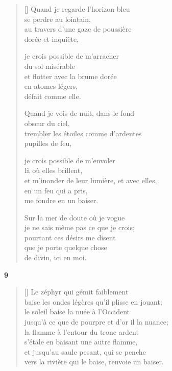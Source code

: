 \documentclass[a4paper,12pt]{book}
\begin{document}
\begin{verse}[\versewidth]
  Quand je regarde l'horizon bleu \\
  se perdre au lointain, \\
  au travers d'une gaze de poussière \\
  dorée et inquiète,

  je crois possible de m'arracher \\
  du sol misérable \\
  et flotter avec la brume dorée \\
  en atomes légers, \\
  défait comme elle.

  Quand je vois de nuit, dans le fond \\
  obscur du ciel, \\
  trembler les étoiles comme d'ardentes \\
  pupilles de feu,

  je crois possible de m'envoler \\
  là où elles brillent, \\
  et m'inonder de leur lumière, et avec elles, \\
  en un feu qui a pris, \\
  me fondre en un baiser.

  Sur la mer de doute où je vogue \\
  je ne sais même pas ce que je crois; \\
  pourtant ces désirs me disent \\
  que je porte quelque chose \\
  de divin, ici en moi.
\end{verse}

\bigskip

\begin{center}
  \textbf{9}
\end{center}

\settowidth{\versewidth}{jusqu'à ce que de pourpre et d'or il la nuance;}

\begin{verse}[\versewidth]
  Le zéphyr qui gémit faiblement \\
  baise les ondes légères qu'il plisse en jouant; \\
  le soleil baise la nuée à l'Occident \\
  jusqu'à ce que de pourpre et d'or il la nuance; \\
  la flamme à l'entour du tronc ardent \\
  s'étale en baisant une autre flamme, \\
  et jusqu'au saule pesant, qui se penche \\
  vers la rivière qui le baise, renvoie un baiser.
\end{verse}
\end{document}
